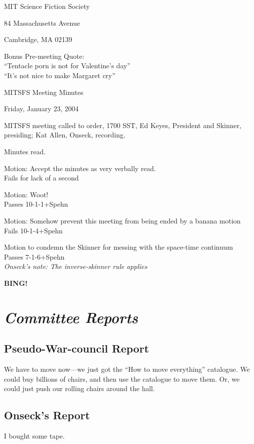 \documentclass[10pt]{article}
\newcommand{\bing}{{\bf BING!} }
\newcommand{\goto}[1]{\bing \vskip 12pt \section*{{\em{#1}}}}
\begin{document}
\begin{center}

MIT Science Fiction Society 

84 Massachusetts Avenue

Cambridge, MA 02139

Bonus Pre-meeting Quote:\\
``Tentacle porn is not for Valentine's day''\\
``It's not nice to make Margaret cry''
\vspace{12pt}

MITSFS Meeting Minutes 

Friday, January 23, 2004

\end{center}
 
\vspace{18pt}

\setlength{\parskip}{6pt}

\noindent
MITSFS meeting called to order, 1700 SST, Ed Keyes, President and
Skinner, presiding; Kat Allen,  Onseck, recording.

Minutes read.

Motion: Accept the minutes as very verbally read.\\
Fails for lack of a second

Motion: Woot!\\
Passes 10-1-1+Spehn

Motion: Somehow prevent this meeting from being ended by a banana
motion\\
Fails 10-1-4+Spehn

Motion to condemn the Skinner for messing with the space-time continuum\\
Passes 7-1-6+Spehn\\
\emph{Onseck's note: The inverse-skinner rule applies}

\goto{Committee Reports}
\subsection*{Pseudo-War-council Report}
We have to move now---we just got the ``How to move everything''
catalogue. We could buy billions of chairs, and then use the catalogue
to move them. Or, we could just push our rolling chairs around the
hall.

\subsection*{Onseck's Report}
I bought some tape.
\end{document}

